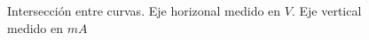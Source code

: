 \begin{figure}[h]
\centering
{}
\caption{Intersección entre curvas. Eje horizonal medido en $V$. Eje vertical medido en $mA$}
\label{4.6}
\end{figure}




